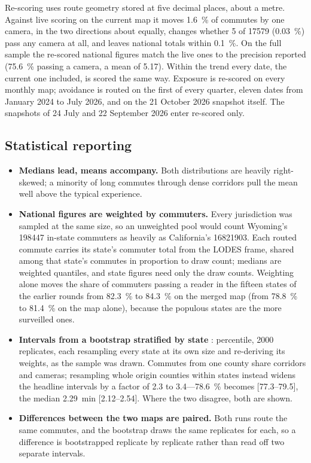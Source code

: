 \documentclass[11pt,twoside]{article}
\begin{document}
Re-scoring uses route geometry stored at five decimal places, about a metre. Against live
scoring on the current map it moves \SI{1.6}{\percent} of commutes by one camera, in the two
directions about equally, changes whether 5 of \num{17579} (\SI{0.03}{\percent}) pass any
camera at all, and leaves national totals within \SI{0.1}{\percent}. On the full sample the
re-scored national figures match the live ones to the precision reported
(\SI{75.6}{\percent} passing a camera, a mean of \num{5.17}). Within the trend every date,
the current one included, is scored the same way. Exposure is re-scored on every monthly map;
avoidance is routed on the first of every quarter, eleven dates from January 2024 to July 2026,
and on the 21 October 2026 snapshot itself. The snapshots of 24 July and 22 September 2026
enter re-scored only.

\subsection{Statistical reporting}
\label{sec:method:stats}

\begin{itemize}
  \item \textbf{Medians lead, means accompany.} Both distributions are heavily
    right-skewed; a minority of long commutes through dense corridors pull the mean well
    above the typical experience.
  \item \textbf{National figures are weighted by commuters.} Every jurisdiction was sampled
    at the same size, so an unweighted pool would count Wyoming's \num{198447} in-state
    commuters as heavily as California's \num{16821903}. Each routed commute carries its
    state's commuter total from the LODES frame, shared among that state's commutes in
    proportion to draw count; medians are weighted quantiles, and state figures need only
    the draw counts. Weighting alone moves the share of commuters passing a reader in the
    fifteen states of the earlier rounds from \SI{82.3}{\percent} to \SI{84.3}{\percent} on the
    merged map (from \SI{78.8}{\percent} to \SI{81.4}{\percent} on the map alone),
    because the populous states are the more surveilled ones.
  \item \textbf{Intervals from a bootstrap stratified by state} \citep{efron1993}:
    percentile, \num{2000} replicates, each resampling every state at its own size and
    re-deriving its weights, as the sample was drawn. Commutes from one county share corridors
    and cameras; resampling whole origin counties within states instead \citep{field2007}
    widens the headline intervals by a factor of 2.3 to 3.4---\SI{78.6}{\percent} becomes
    [77.3--79.5], the median \SI{2.29}{\minute} [2.12--2.54]. Where the two disagree, both
    are shown.
  \item \textbf{Differences between the two maps are paired.} Both runs route the same
    commutes, and the bootstrap draws the same replicates for each, so a difference is
    bootstrapped replicate by replicate rather than read off two separate intervals.
\end{itemize}
\end{document}

